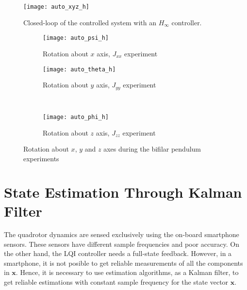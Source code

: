 \begin{figure}[h]
	\begin{center}
	\texttt{[image: auto\_xyz\_h]}
	\caption{Closed-loop of the controlled system with an $H_{\infty}$ controller.}
	\label{fig:auto_xyz_h}
	\end{center}
	\end{figure}
	
\begin{figure}[H]
\begin{subfigure}{.5\linewidth}
\centering
\texttt{[image: auto\_psi\_h]}
\caption{Rotation about $x$ axis, $J_{xx}$ experiment}
\label{fig:auto_psi_h}
\end{subfigure}%
\begin{subfigure}{.5\linewidth}
\centering
\texttt{[image: auto\_theta\_h]}
\caption{Rotation about $y$ axis, $J_{yy}$ experiment}
\label{fig:auto_theta_h}
\end{subfigure}\\[1ex]
\begin{subfigure}{\linewidth}
\centering
\texttt{[image: auto\_phi\_h]}
\caption{Rotation about $z$ axis, $J_{zz}$ experiment}
\label{fig:auto_psi_h}
\end{subfigure}
\caption{Rotation about $x$, $y$ and $z$ axes during the bifilar pendulum experiments}
\label{fig:auto_h}
\end{figure}

\section{State Estimation Through Kalman Filter}
\label{sec:stateestimation}
The quadrotor dynamics are sensed exclusively using the on-board smartphone sensors. These sensors have different sample frequencies and poor accuracy. On the other hand, the LQI controller needs a full-state feedback. However, in a smartphone, it is not posible to get reliable measurements of all the components in $\mathbf{x}$. Hence, it is necessary to use estimation algorithms, as a Kalman filter, to get reliable estimations with constant sample frequency for the state vector $\mathbf{x}$.

